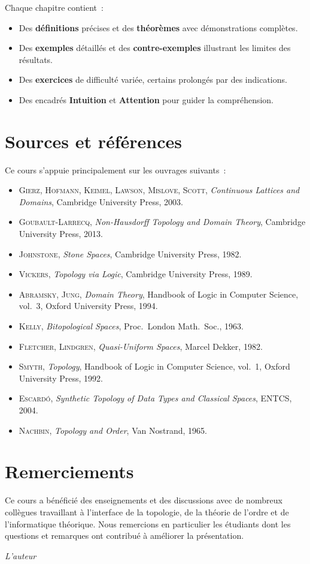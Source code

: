 Chaque chapitre contient~:
\begin{itemize}
  \item Des \textbf{d\'efinitions} pr\'ecises et des \textbf{th\'eor\`emes} avec d\'emonstrations
    compl\`etes.
  \item Des \textbf{exemples} d\'etaill\'es et des \textbf{contre-exemples} illustrant les
    limites des r\'esultats.
  \item Des \textbf{exercices} de difficult\'e vari\'ee, certains prolong\'es par des indications.
  \item Des encadr\'es \textbf{Intuition} et \textbf{Attention} pour guider la compr\'ehension.
\end{itemize}

\section*{Sources et r\'ef\'erences}

Ce cours s'appuie principalement sur les ouvrages suivants~:
\begin{itemize}
  \item \textsc{Gierz, Hofmann, Keimel, Lawson, Mislove, Scott},
    \emph{Continuous Lattices and Domains}, Cambridge University Press, 2003.
  \item \textsc{Goubault-Larrecq}, \emph{Non-Hausdorff Topology and Domain Theory},
    Cambridge University Press, 2013.
  \item \textsc{Johnstone}, \emph{Stone Spaces}, Cambridge University Press, 1982.
  \item \textsc{Vickers}, \emph{Topology via Logic}, Cambridge University Press, 1989.
  \item \textsc{Abramsky, Jung}, \emph{Domain Theory}, Handbook of Logic in Computer
    Science, vol.~3, Oxford University Press, 1994.
  \item \textsc{Kelly}, \emph{Bitopological Spaces}, Proc.\ London Math.\ Soc., 1963.
  \item \textsc{Fletcher, Lindgren}, \emph{Quasi-Uniform Spaces}, Marcel Dekker, 1982.
  \item \textsc{Smyth}, \emph{Topology}, Handbook of Logic in Computer Science, vol.~1,
    Oxford University Press, 1992.
  \item \textsc{Escard\'o}, \emph{Synthetic Topology of Data Types and Classical Spaces},
    ENTCS, 2004.
  \item \textsc{Nachbin}, \emph{Topology and Order}, Van Nostrand, 1965.
\end{itemize}

\section*{Remerciements}

Ce cours a b\'en\'efici\'e des enseignements et des discussions avec de nombreux coll\`egues
travaillant \`a l'interface de la topologie, de la th\'eorie de l'ordre et de l'informatique
th\'eorique. Nous remercions en particulier les \'etudiants dont les questions et remarques
ont contribu\'e \`a am\'eliorer la pr\'esentation.

\bigskip
\hfill\emph{L'auteur}
